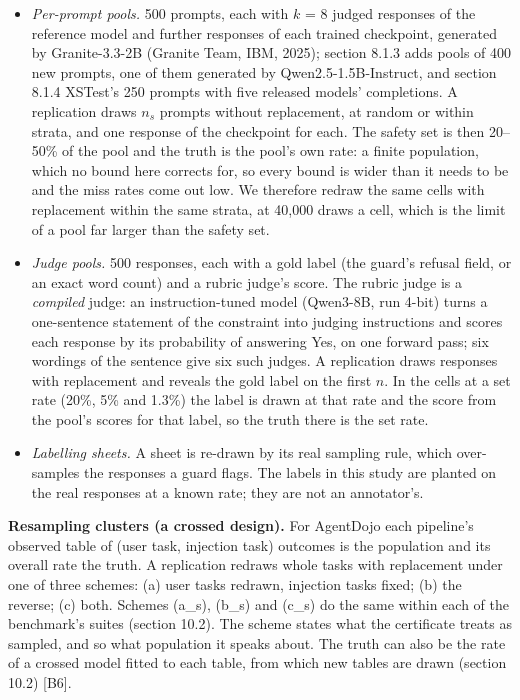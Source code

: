 \documentclass[11pt]{article}
\begin{document}
\begin{itemize}
\item \emph{Per-prompt pools.} 500 prompts, each with $k$ = 8 judged responses of the reference model and further responses of each trained checkpoint, generated by Granite-3.3-2B (Granite Team, IBM, 2025); section 8.1.3 adds pools of 400 new prompts, one of them generated by Qwen2.5-1.5B-Instruct, and section 8.1.4 XSTest's 250 prompts with five released models' completions. A replication draws $n_{s}$ prompts without replacement, at random or within strata, and one response of the checkpoint for each. The safety set is then 20--50\% of the pool and the truth is the pool's own rate: a finite population, which no bound here corrects for, so every bound is wider than it needs to be and the miss rates come out low. We therefore redraw the same cells with replacement within the same strata, at 40,000 draws a cell, which is the limit of a pool far larger than the safety set.
\item \emph{Judge pools.} 500 responses, each with a gold label (the guard's refusal field, or an exact word count) and a rubric judge's score. The rubric judge is a \emph{compiled} judge: an instruction-tuned model (Qwen3-8B, run 4-bit) turns a one-sentence statement of the constraint into judging instructions and scores each response by its probability of answering Yes, on one forward pass; six wordings of the sentence give six such judges. A replication draws responses with replacement and reveals the gold label on the first $n$. In the cells at a set rate (20\%, 5\% and 1.3\%) the label is drawn at that rate and the score from the pool's scores for that label, so the truth there is the set rate.
\item \emph{Labelling sheets.} A sheet is re-drawn by its real sampling rule, which over-samples the responses a guard flags. The labels in this study are planted on the real responses at a known rate; they are not an annotator's.
\end{itemize}

\textbf{Resampling clusters (a crossed design).} For AgentDojo each pipeline's observed table of (user task, injection task) outcomes is the population and its overall rate the truth. A replication redraws whole tasks with replacement under one of three schemes: (a) user tasks redrawn, injection tasks fixed; (b) the reverse; (c) both. Schemes (a\_s), (b\_s) and (c\_s) do the same within each of the benchmark's suites (section 10.2). The scheme states what the certificate treats as sampled, and so what population it speaks about. The truth can also be the rate of a crossed model fitted to each table, from which new tables are drawn (section 10.2) [B6].
\end{document}
